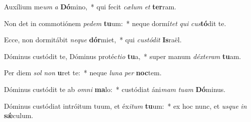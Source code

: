 \item Auxílium me\textit{um} \textit{a} \textbf{Dó}mino,~* qui fecit \textit{cæ}\textit{lum} \textit{et} \textbf{ter}ram.
\item Non det in commotiónem \textit{pe}\textit{dem} \textbf{tu}um:~* neque dormí\textit{tet} \textit{qui} \textit{cus}\textbf{tó}dit te.
\item Ecce, non dormitábit \textit{ne}\textit{que} \textbf{dór}miet,~* qui \textit{cus}\textit{tó}\textit{dit} \textbf{Is}raël.
\item Dóminus custódit te, Dóminus protéc\textit{ti}\textit{o} \textbf{tu}a,~* super manum \textit{déx}\textit{te}\textit{ram} \textbf{tu}am.
\item Per diem \textit{sol} \textit{non} \textbf{u}ret te:~* neque \textit{lu}\textit{na} \textit{per} \textbf{noc}tem.
\item Dóminus custódit te ab \textit{om}\textit{ni} \textbf{ma}lo:~* custódiat áni\textit{mam} \textit{tu}\textit{am} \textbf{Dó}minus.
\item Dóminus custódiat intróitum tuum, et éx\textit{i}\textit{tum} \textbf{tu}um:~* ex hoc nunc, et \textit{us}\textit{que} \textit{in} \textbf{sǽ}culum.
